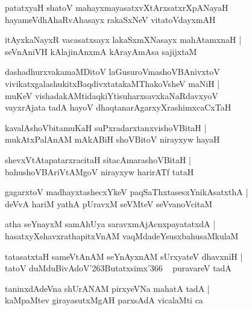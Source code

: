 \documentclass[twoside,12pt,openright]{book}
\def\S{\char'263}
\newcounter{shloka}[chapter]
\begin{document}
\begin{shloka}%
patatxyaH shatoV mahayxmayasatxvXtArxsatxrXpANayaH \\
hayameVdhAhaRvAhasayx rakaSxNeV vitatoVdayxmAH 
\end{shloka}

\begin{shloka}%
itAyxkaNayxR vacasatxsayx lakaSxmXNasayx mahAtamxnaH |\\
seVnAniVH kAlajinAnxmA kArayAmAsa sajijxtaM 
\end{shloka}

\begin{shloka}%
dashadhurxvakamaMDitoV laGusuroVmashoVBAnivxtoV \\
vivikatxgalashukitxBaqdivxtatakaMThakoVsheV maNiH |\\
muKeV vishadakAMtidaqkiYtisuharxsavxkaNaRdavxyoV \\
vayxrAjata tadA hayoV dhaqtanarAgarxyXrashimxcaCxTaH
\end{shloka}

\begin{shloka}%
kavalAshoVbitamuKaH suPxradarxtanxvishoVBitaH |\\
mukAtxPalAnAM mAkABiH shoVBitoV nirayxyw hayaH  
\end{shloka}

\begin{shloka}%
shevxVtAtapatarxracitaH sitacAmarashoVBitaH |\\
bahushoVBAriVtAMgoV nirayxyw harirATf tataH 
\end{shloka}

\begin{shloka}%
gagarxtoV madhayxtashecxYkeV paqSaThxtasesxYnikAsatxthA |\\
deVvA hariM yathA pUravxM seVMteV seVvanoVcitaM
\end{shloka}

\begin{shloka}%
atha seYnayxM samAhUya saravxmAjAcnxpayatatxdA |\\
hasatxyXshavxrathapitxVnAM vaqMdadeYsusxbahusaMkulaM 
\end{shloka}

\begin{shloka}%
tatasatxtaH sameVtAnAM seYnAyxnAM sUrxyateV dhavxniH |\\
tatoV duMduBivAdoV\S Butatxsimx\char'366 ~ puravareV tadA
\end{shloka}

\begin{shloka}%
taninxdAdeVna shUrANAM pirxyeVNa mahatA tadA |\\
kaMpaMtev girayasutxMgAH parxsAdA vicalaMti ca 
\end{shloka}
\end{document}
